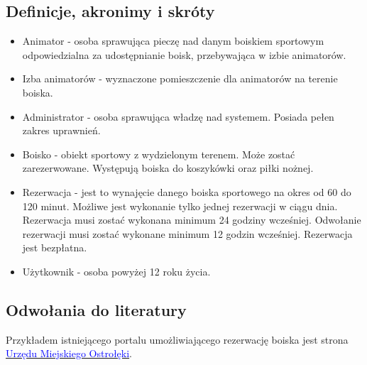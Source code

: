 \documentclass[a4paper,11pt]{article}
\begin{document}
\subsection {Definicje, akronimy i skróty}
\begin{itemize}
	\item Animator - osoba sprawująca pieczę nad danym boiskiem sportowym odpowiedzialna za udostępnianie boisk, przebywająca w izbie animatorów.
	\item Izba animatorów - wyznaczone pomieszczenie dla animatorów na terenie boiska.
	\item Administrator - osoba sprawująca władzę nad systemem. Posiada pełen zakres uprawnień.
	\item Boisko - obiekt sportowy z wydzielonym terenem. Może zostać zarezerwowane. Występują boiska do koszykówki oraz piłki nożnej.
	\item Rezerwacja - jest to wynajęcie danego boiska sportowego na okres od 60 do 120 minut. Możliwe jest wykonanie tylko jednej rezerwacji w ciągu dnia. Rezerwacja musi zostać wykonana minimum 24 godziny wcześniej. Odwołanie rezerwacji musi zostać wykonane minimum 12 godzin wcześniej. Rezerwacja jest bezpłatna.
	\item Użytkownik - osoba powyżej 12 roku życia.
\end{itemize}

\subsection {Odwołania do literatury}
Przykładem istniejącego portalu umożliwiającego rezerwację boiska jest strona  \href{https://www.ostroleka.pl/boiska/}{\textcolor{blue}{Urzędu Miejskiego Ostrołęki}}.
\end{document}
